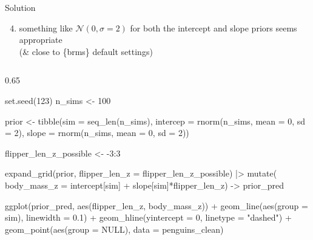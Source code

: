 \documentclass[
  10pt,
  ignorenonframetext,
  aspectratio=169,
  t]{beamer}
\newenvironment{Shaded}{\begin{snugshade}}{\end{snugshade}}
\newcommand{\AttributeTok}[1]{\textcolor[rgb]{0.40,0.45,0.13}{#1}}
\newcommand{\ConstantTok}[1]{\textcolor[rgb]{0.56,0.35,0.01}{#1}}
\newcommand{\DecValTok}[1]{\textcolor[rgb]{0.68,0.00,0.00}{#1}}
\newcommand{\FloatTok}[1]{\textcolor[rgb]{0.68,0.00,0.00}{#1}}
\newcommand{\FunctionTok}[1]{\textcolor[rgb]{0.28,0.35,0.67}{#1}}
\newcommand{\NormalTok}[1]{\textcolor[rgb]{0.00,0.23,0.31}{#1}}
\newcommand{\OtherTok}[1]{\textcolor[rgb]{0.00,0.23,0.31}{#1}}
\newcommand{\SpecialCharTok}[1]{\textcolor[rgb]{0.37,0.37,0.37}{#1}}
\newcommand{\StringTok}[1]{\textcolor[rgb]{0.13,0.47,0.30}{#1}}
\providecommand{\tightlist}{%
  \setlength{\itemsep}{0pt}\setlength{\parskip}{0pt}}
\begin{document}
\begin{frame}[fragile]{Solution}
\protect{}\label{solution-2}
\begin{enumerate}
\setcounter{enumi}{3}
\tightlist
\item
  something like \(\mathcal{N}(0, \sigma = 2)\) for both the intercept
  and slope priors seems appropriate\\
  (\& close to \{brms\} default settings)
\end{enumerate}

\begin{columns}[T]
\begin{column}{0.65\linewidth}
\footnotesize

\begin{Shaded}
\begin{Highlighting}[]
\FunctionTok{set.seed}\NormalTok{(}\DecValTok{123}\NormalTok{)}
\NormalTok{n\_sims }\OtherTok{\textless{}{-}} \DecValTok{100}

\NormalTok{prior }\OtherTok{\textless{}{-}} \FunctionTok{tibble}\NormalTok{(}\AttributeTok{sim =} \FunctionTok{seq\_len}\NormalTok{(n\_sims),}
                \AttributeTok{intercep =} \FunctionTok{rnorm}\NormalTok{(n\_sims, }\AttributeTok{mean =} \DecValTok{0}\NormalTok{, }\AttributeTok{sd =} \DecValTok{2}\NormalTok{),}
                \AttributeTok{slope =} \FunctionTok{rnorm}\NormalTok{(n\_sims, }\AttributeTok{mean =} \DecValTok{0}\NormalTok{, }\AttributeTok{sd =} \DecValTok{2}\NormalTok{))}
              
\NormalTok{flipper\_len\_z\_possible }\OtherTok{\textless{}{-}} \SpecialCharTok{{-}}\DecValTok{3}\SpecialCharTok{:}\DecValTok{3}

\FunctionTok{expand\_grid}\NormalTok{(prior, }\AttributeTok{flipper\_len\_z =}\NormalTok{ flipper\_len\_z\_possible) }\SpecialCharTok{|\textgreater{}}
  \FunctionTok{mutate}\NormalTok{(}
    \AttributeTok{body\_mass\_z =}\NormalTok{ intercept[sim] }\SpecialCharTok{+}\NormalTok{ slope[sim]}\SpecialCharTok{*}\NormalTok{flipper\_len\_z) }\OtherTok{{-}\textgreater{}}\NormalTok{ prior\_pred}

\FunctionTok{ggplot}\NormalTok{(prior\_pred, }\FunctionTok{aes}\NormalTok{(flipper\_len\_z, body\_mass\_z)) }\SpecialCharTok{+}
  \FunctionTok{geom\_line}\NormalTok{(}\FunctionTok{aes}\NormalTok{(}\AttributeTok{group =}\NormalTok{ sim), }\AttributeTok{linewidth =} \FloatTok{0.1}\NormalTok{) }\SpecialCharTok{+} 
  \FunctionTok{geom\_hline}\NormalTok{(}\AttributeTok{yintercept =} \DecValTok{0}\NormalTok{, }\AttributeTok{linetype =} \StringTok{"dashed"}\NormalTok{) }\SpecialCharTok{+}
  \FunctionTok{geom\_point}\NormalTok{(}\FunctionTok{aes}\NormalTok{(}\AttributeTok{group =} \ConstantTok{NULL}\NormalTok{), }\AttributeTok{data =}\NormalTok{ penguins\_clean)}
\end{Highlighting}
\end{Shaded}


\end{column}
\end{columns}
\end{frame}
\end{document}
